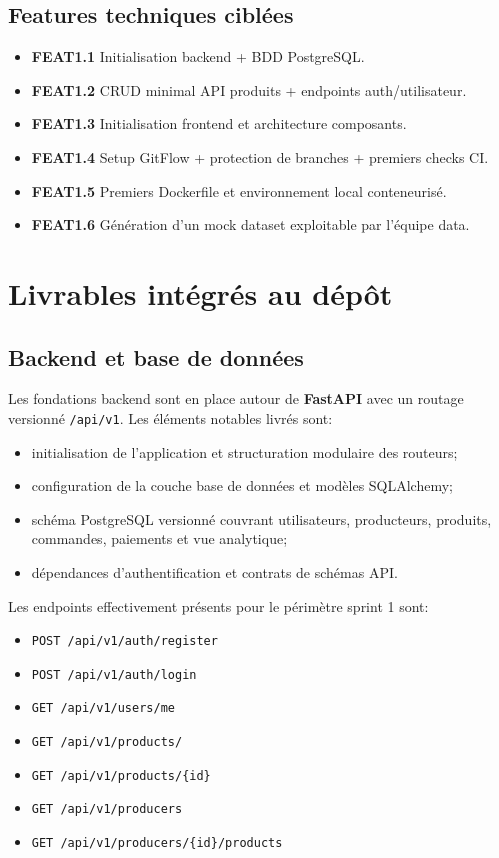 \documentclass[11pt,a4paper]{article}
\begin{document}
\subsection{Features techniques ciblées}

\begin{itemize}[leftmargin=1.5em]
  \item \textbf{FEAT1.1} Initialisation backend + BDD PostgreSQL.
  \item \textbf{FEAT1.2} CRUD minimal API produits + endpoints auth/utilisateur.
  \item \textbf{FEAT1.3} Initialisation frontend et architecture composants.
  \item \textbf{FEAT1.4} Setup GitFlow + protection de branches + premiers checks CI.
  \item \textbf{FEAT1.5} Premiers Dockerfile et environnement local conteneurisé.
  \item \textbf{FEAT1.6} Génération d'un mock dataset exploitable par l'équipe data.
\end{itemize}

\section{Livrables intégrés au dépôt}

\subsection{Backend et base de données}

Les fondations backend sont en place autour de \textbf{FastAPI} avec un routage versionné \texttt{/api/v1}. Les éléments notables livrés sont:

\begin{itemize}[leftmargin=1.5em]
  \item initialisation de l'application et structuration modulaire des routeurs;
  \item configuration de la couche base de données et modèles SQLAlchemy;
  \item schéma PostgreSQL versionné couvrant utilisateurs, producteurs, produits, commandes, paiements et vue analytique;
  \item dépendances d'authentification et contrats de schémas API.
\end{itemize}

Les endpoints effectivement présents pour le périmètre sprint 1 sont:

\begin{itemize}[leftmargin=1.5em]
  \item \texttt{POST /api/v1/auth/register}
  \item \texttt{POST /api/v1/auth/login}
  \item \texttt{GET /api/v1/users/me}
  \item \texttt{GET /api/v1/products/}
  \item \texttt{GET /api/v1/products/\{id\}}
  \item \texttt{GET /api/v1/producers}
  \item \texttt{GET /api/v1/producers/\{id\}/products}
\end{itemize}
\end{document}
